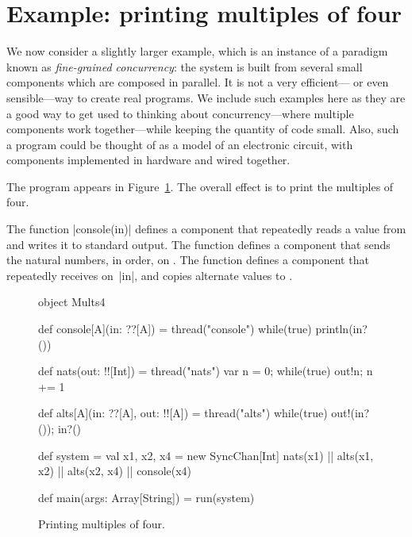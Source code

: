 
\section{Example: printing multiples of four}

We now consider a slightly larger example, which is an instance of a paradigm
known as \emph{fine-grained concurrency}: the system is built from several
small components which are composed in parallel.  It is not a very
efficient--- or even sensible---way to create real programs.  We include such
examples here as they are a good way to get used to thinking about
concurrency---where multiple components work together---while keeping the
quantity of code small.  Also, such a program could be thought of as a model
of an electronic circuit, with components implemented in hardware and wired
together.

The program appears in Figure~\ref{fig:Mults4}. The overall effect is to print
the multiples of four.

The function |console(in)| defines a component that repeatedly reads a value
from  and writes it to standard output.  The function
 defines a component that sends the natural numbers, in
order, on .  The function  defines a component
that repeatedly receives on~|in|, and copies alternate values to .


\begin{figure}
\begin{scala}
object Mults4{
  def console[A](in: ??[A]) = thread("console"){ while(true) println(in?()) }

  def nats(out: !![Int]) = thread("nats"){ 
    var n = 0; while(true){ out!n; n += 1 }
  }

  def alts[A](in: ??[A], out: !![A]) = thread("alts"){ 
    while(true){ out!(in?()); in?() } 
  }

  def system = {
    val x1, x2, x4 = new SyncChan[Int]
    nats(x1) || alts(x1, x2) || alts(x2, x4) || console(x4)
  }

  def main(args: Array[String]) = run(system)
}
\end{scala}
\caption{Printing multiples of four.}
\label{fig:Mults4}
\end{figure}


